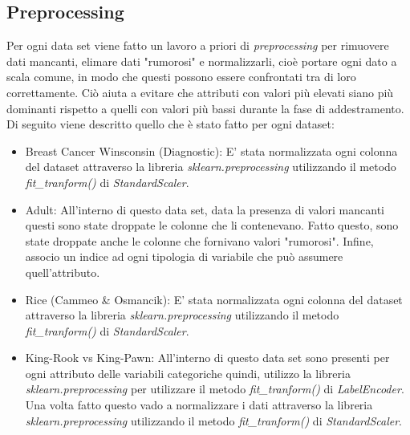 \documentclass{article}
\begin{document}
	\subsection{Preprocessing}
    Per ogni data set viene fatto un lavoro a priori di \textit{preprocessing} per rimuovere dati mancanti, elimare dati "rumorosi" e normalizzarli, cioè portare ogni dato a scala comune, in modo che questi possono essere confrontati tra di loro correttamente. Ciò aiuta a evitare che attributi con valori più elevati siano più dominanti rispetto a quelli con valori più bassi durante la fase di addestramento.
	Di seguito viene descritto quello che è stato fatto per ogni dataset:
	\begin{itemize}
		\item Breast Cancer Winsconsin (Diagnostic): E' stata normalizzata ogni colonna del dataset attraverso la libreria \textit{sklearn.preprocessing} utilizzando il metodo \textit{fit\_tranform()} di \textit{StandardScaler}.
		\item Adult: All'interno di questo data set, data la presenza di valori mancanti questi sono state droppate le colonne che li contenevano. Fatto questo, sono state droppate anche le colonne che fornivano valori "rumorosi". Infine, associo un indice ad ogni tipologia di variabile che può assumere quell'attributo.
		\item Rice (Cammeo \& Osmancik): E' stata normalizzata ogni colonna del dataset attraverso la libreria \textit{sklearn.preprocessing} utilizzando il metodo \textit{fit\_tranform()} di \textit{StandardScaler}.
		\item King-Rook vs King-Pawn: All'interno di questo data set sono presenti per ogni attributo delle variabili categoriche quindi, utilizzo la libreria \textit{sklearn.preprocessing} per utilizzare il metodo \textit{fit\_tranform()} di \textit{LabelEncoder}. Una volta fatto questo vado a normalizzare i dati attraverso la libreria \textit{sklearn.preprocessing} utilizzando il metodo \textit{fit\_tranform()} di \textit{StandardScaler}.
	\end{itemize} 
\end{document}
